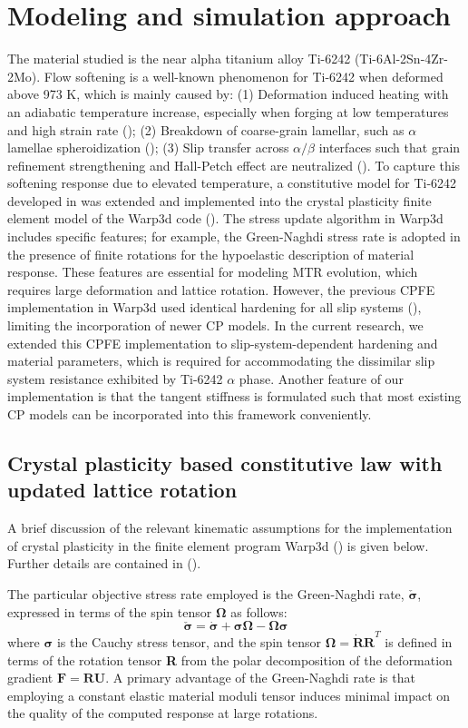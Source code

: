 \documentclass[review]{elsarticle}
\begin{document}
\section{Modeling and simulation approach}
\label{simulation}
The material studied is the near alpha titanium alloy Ti-6242 (Ti-6Al-2Sn-4Zr-2Mo).
Flow softening is a well-known phenomenon for Ti-6242 when deformed above 973 K, which is mainly caused by:
(1) Deformation induced heating with an adiabatic temperature increase, especially when forging at low temperatures and high strain rate (\cite{softOverview});
(2) Breakdown of coarse-grain lamellar, such as $\alpha$ lamellae spheroidization (\cite{softOverview});
(3) Slip transfer across $\alpha/\beta$ interfaces such that grain refinement strengthening and Hall-Petch effect are neutralized (\cite{softSlip}).
To capture this softening response due to elevated temperature, a constitutive model for Ti-6242 developed in \cite{r18} was extended and implemented into the crystal plasticity finite element model of the Warp3d code (\cite{r21}).
The stress update algorithm in Warp3d includes specific features; for example, the Green-Naghdi stress rate is adopted in the presence of finite rotations for the hypoelastic description of material response.
These features are essential for modeling MTR evolution, which requires large deformation and lattice rotation.
However, the previous CPFE implementation in Warp3d used identical hardening for all slip systems (\cite{r22,r23}), limiting the incorporation of newer CP models.
In the current research, we extended this CPFE implementation to slip-system-dependent hardening and material parameters, which is required for accommodating the dissimilar slip system resistance exhibited by Ti-6242 $\alpha$ phase.
Another feature of our implementation is that the tangent stiffness is formulated such that most existing CP models can be incorporated into this framework conveniently.
	\subsection{Crystal plasticity based constitutive law with updated lattice rotation}
	A brief discussion of the relevant kinematic assumptions for the implementation of crystal plasticity in the finite element program Warp3d (\cite{r21}) is given below.
	Further details are contained in (\cite{r22}).
	
	The particular objective stress rate employed is the Green-Naghdi rate, $\check{\bm{\sigma}}$, expressed in terms of the spin tensor $\mathbf{\Omega}$ as follows:
	\begin{equation}
	\check{\bm{\sigma}} = \dot{\bm{\sigma}} + \bm{\sigma\Omega} - \bm{\Omega\sigma}
	\label{eq:GNrate}
	\end{equation}
	where $\bm{\sigma}$ is the Cauchy stress tensor, and the spin tensor $\mathbf{\Omega=\dot{R}R}^T$ is defined in terms of the rotation tensor \textbf{R} from the polar decomposition of the deformation gradient $\mathbf{F=RU}$.
	A primary advantage of the Green-Naghdi rate is that employing a constant elastic material moduli tensor induces minimal impact on the quality of the computed response at large rotations.
	
\end{document}
